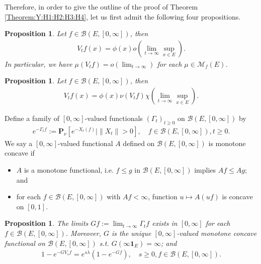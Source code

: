 \documentclass[12pt,a4paper]{amsart}
\numberwithin{equation}{section}
\theoremstyle{plain}
\newtheorem{prop}[thm]{Proposition}
\theoremstyle{definition}
\theoremstyle{remark}
\begin{document}
Therefore, in order to give the outline of the proof of Theorem \ref{Theorem:Y:H1:H2:H3:H4}, let us first admit the following four propositions.
\begin{prop} \label{Proposition:Vf1:H1:H2:H4} 
Let $f\in \mathcal B(E, [0,\infty])$, then
\begin{align} 
 V_tf(x) = \phi(x) o(\lim_{t\to \infty} \sup_{x\in E}).
 \end{align}
In particular, we have $\mu(V_tf)= o(\lim_{t\to \infty})$ for each $\mu \in \mathcal M_f(E)$.
\end{prop} 
\begin{prop} \label{Proposition:Vf2:H1:H2:H3:H4} 
Let $f\in \mathcal B(E,[0,\infty])$, then 
\begin{align}
V_tf(x)
=\phi(x) \nu (V_tf) \chi(\lim_{t\to \infty} \sup_{x\in E}).
\end{align}
\end{prop}
\par
Define a family of $[0,\infty]$-valued functionals $(\Gamma_t)_{t\geq 0}$ on $\mathcal B(E,[0,\infty])$ by 
\begin{align}
 e^{-\Gamma_t f} 
:= \mathbf P_{\nu}[e^{- X_t(f)}| \|X_t\| > 0], 
 \quad f\in \mathcal B(E,[0,\infty]), t \geq 0.
 \end{align}
We say a $[0,\infty]$-valued functional $A$ defined on $\mathcal B(E,[0,\infty])$ is monotone concave if
\begin{itemize}
\item
$A$ is a monotone functional, i.e. $f\leq g$ in $\mathcal B(E,[0,\infty])$ implies $Af \leq Ag$; and
\item
for each $f\in \mathcal B(E,[0,\infty])$ with $Af< \infty$, function $u \mapsto A(uf)$ is concave on $[0,1]$.
\end{itemize}
\begin{prop} \label{Proposition:G:H1:H2:H3:H4} 
The limits $Gf:= \lim_{t\to \infty} \Gamma_t f$ exists in $[0,\infty]$ for each $f\in \mathcal B(E,[0,\infty])$. 
Moreover, $G$ is the unique $[0,\infty]$-valued monotone concave functional on $\mathcal B(E,[0,\infty])$ s.t. $G(\infty \mathbf 1_E) = \infty$; and
\begin{align} 
1 - e^{- GV_s f} 
= e^{s\lambda} (1 - e^{-Gf}), 
\quad s\geq 0, f\in \mathcal B(E,[0,\infty]).
\end{align}
\end{prop} 
\end{document}
